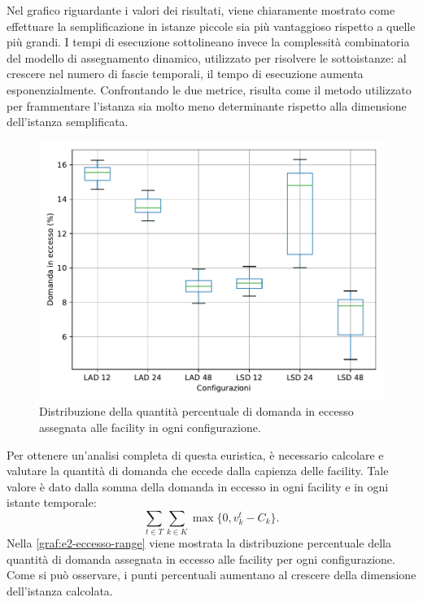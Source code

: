 Nel grafico riguardante i valori dei risultati, viene chiaramente mostrato come effettuare la semplificazione in istanze piccole sia più vantaggioso rispetto a quelle più grandi. I tempi di esecuzione sottolineano invece la complessità combinatoria del modello di assegnamento dinamico, utilizzato per risolvere le sottoistanze: al crescere nel numero di fascie temporali, il tempo di esecuzione aumenta esponenzialmente. Confrontando le due metrice, risulta come il metodo utilizzato per frammentare l'istanza sia molto meno determinante rispetto alla dimensione dell'istanza semplificata.

\begin{figure}[t]
    \centering
    \includegraphics[scale=0.70]{img/grafico-e2-eccesso.pdf}
    \caption{Distribuzione della quantità percentuale di domanda in eccesso assegnata alle facility in ogni configurazione.}
    \label{graf:e2-eccesso-range}
\end{figure}

Per ottenere un'analisi completa di questa euristica, è necessario calcolare e valutare la quantità di domanda che eccede dalla capienza delle facility. Tale valore è dato dalla somma della domanda in eccesso in ogni facility e in ogni istante temporale:
\begin{equation}
    \sum_{t \in T} \sum_{k \in K} \max\{0, v^t_k - C_k\}.
\end{equation}
Nella \autoref{graf:e2-eccesso-range} viene mostrata la distribuzione percentuale della quantità di domanda assegnata in eccesso alle facility per ogni configurazione. Come si può osservare, i punti percentuali aumentano al crescere della dimensione dell'istanza calcolata.
